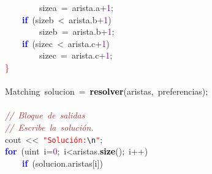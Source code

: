\mbox{}\ \ \ \ \ \ \ \ \ \ \ \ sizea\ \textcolor{BrickRed}{=}\ arista\textcolor{BrickRed}{.}a\textcolor{BrickRed}{+}\textcolor{Purple}{1}\textcolor{BrickRed}{;} \\
\mbox{}\ \ \ \ \ \ \ \ \textbf{\textcolor{Blue}{if}}\ \textcolor{BrickRed}{(}sizeb\ \textcolor{BrickRed}{\textless{}}\ arista\textcolor{BrickRed}{.}b\textcolor{BrickRed}{+}\textcolor{Purple}{1}\textcolor{BrickRed}{)} \\
\mbox{}\ \ \ \ \ \ \ \ \ \ \ \ sizeb\ \textcolor{BrickRed}{=}\ arista\textcolor{BrickRed}{.}b\textcolor{BrickRed}{+}\textcolor{Purple}{1}\textcolor{BrickRed}{;} \\
\mbox{}\ \ \ \ \ \ \ \ \textbf{\textcolor{Blue}{if}}\ \textcolor{BrickRed}{(}sizec\ \textcolor{BrickRed}{\textless{}}\ arista\textcolor{BrickRed}{.}c\textcolor{BrickRed}{+}\textcolor{Purple}{1}\textcolor{BrickRed}{)} \\
\mbox{}\ \ \ \ \ \ \ \ \ \ \ \ sizec\ \textcolor{BrickRed}{=}\ arista\textcolor{BrickRed}{.}c\textcolor{BrickRed}{+}\textcolor{Purple}{1}\textcolor{BrickRed}{;} \\
\mbox{}\ \ \ \ \textcolor{Red}{\}} \\
\mbox{} \\
\mbox{}\ \ \ \ \textcolor{TealBlue}{Matching}\ solucion\ \textcolor{BrickRed}{=}\ \textbf{\textcolor{Black}{resolver}}\textcolor{BrickRed}{(}aristas\textcolor{BrickRed}{,}\ preferencias\textcolor{BrickRed}{);} \\
\mbox{} \\
\mbox{}\ \ \ \ \textit{\textcolor{Brown}{//\ Bloque\ de\ salidas}} \\
\mbox{}\ \ \ \ \textit{\textcolor{Brown}{//\ Escribe\ la\ solución.}} \\
\mbox{}\ \ \ \ cout\ \textcolor{BrickRed}{\textless{}\textless{}}\ \texttt{\textcolor{Red}{"{}Solución:}}\texttt{\textcolor{CarnationPink}{\textbackslash{}n}}\texttt{\textcolor{Red}{"{}}}\textcolor{BrickRed}{;} \\
\mbox{}\ \ \ \ \textbf{\textcolor{Blue}{for}}\ \textcolor{BrickRed}{(}\textcolor{TealBlue}{uint}\ i\textcolor{BrickRed}{=}\textcolor{Purple}{0}\textcolor{BrickRed}{;}\ i\textcolor{BrickRed}{\textless{}}aristas\textcolor{BrickRed}{.}\textbf{\textcolor{Black}{size}}\textcolor{BrickRed}{();}\ i\textcolor{BrickRed}{++)} \\
\mbox{}\ \ \ \ \ \ \ \ \textbf{\textcolor{Blue}{if}}\ \textcolor{BrickRed}{(}solucion\textcolor{BrickRed}{.}aristas\textcolor{BrickRed}{[}i\textcolor{BrickRed}{])} \\
